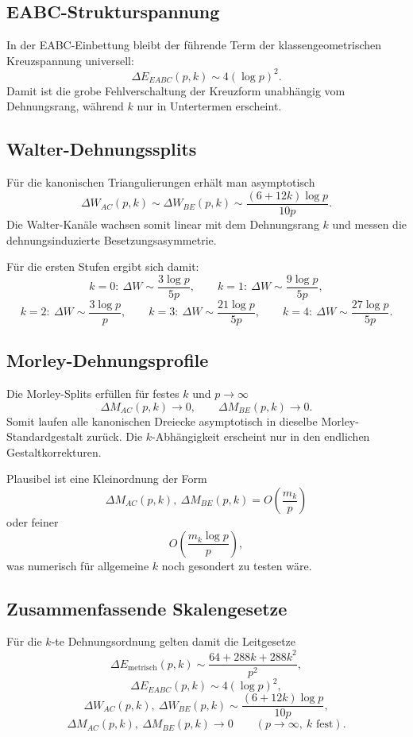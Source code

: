 \subsection{EABC-Strukturspannung}

In der EABC-Einbettung bleibt der führende Term der klassengeometrischen Kreuzspannung universell:
\[
\Delta E_{EABC}(p,k)\sim 4(\log p)^2.
\]
Damit ist die grobe Fehlverschaltung der Kreuzform unabhängig vom Dehnungsrang, während \(k\) nur in Untertermen erscheint.

\subsection{Walter-Dehnungssplits}

Für die kanonischen Triangulierungen erhält man asymptotisch
\[
\Delta W_{AC}(p,k)\sim \Delta W_{BE}(p,k)\sim \frac{(6+12k)\log p}{10p}.
\]
Die Walter-Kanäle wachsen somit linear mit dem Dehnungsrang \(k\) und messen die dehnungsinduzierte Besetzungsasymmetrie.

Für die ersten Stufen ergibt sich damit:
\[
k=0:\ \Delta W \sim \frac{3\log p}{5p},
\qquad
k=1:\ \Delta W \sim \frac{9\log p}{5p},
\]
\[
k=2:\ \Delta W \sim \frac{3\log p}{p},
\qquad
k=3:\ \Delta W \sim \frac{21\log p}{5p},
\qquad
k=4:\ \Delta W \sim \frac{27\log p}{5p}.
\]

\subsection{Morley-Dehnungsprofile}

Die Morley-Splits erfüllen für festes \(k\) und \(p\to\infty\)
\[
\Delta M_{AC}(p,k)\to 0,
\qquad
\Delta M_{BE}(p,k)\to 0.
\]
Somit laufen alle kanonischen Dreiecke asymptotisch in dieselbe Morley-Standardgestalt zurück. Die \(k\)-Abhängigkeit erscheint nur in den endlichen Gestaltkorrekturen.

Plausibel ist eine Kleinordnung der Form
\[
\Delta M_{AC}(p,k),\ \Delta M_{BE}(p,k)=O\!\left(\frac{m_k}{p}\right)
\]
oder feiner
\[
O\!\left(\frac{m_k\log p}{p}\right),
\]
was numerisch für allgemeine \(k\) noch gesondert zu testen wäre.

\subsection{Zusammenfassende Skalengesetze}

Für die \(k\)-te Dehnungsordnung gelten damit die Leitgesetze
\[
\Delta E_{\mathrm{metrisch}}(p,k)
\sim
\frac{64+288k+288k^2}{p^2},
\]
\[
\Delta E_{EABC}(p,k)\sim 4(\log p)^2,
\]
\[
\Delta W_{AC}(p,k),\ \Delta W_{BE}(p,k)\sim \frac{(6+12k)\log p}{10p},
\]
\[
\Delta M_{AC}(p,k),\ \Delta M_{BE}(p,k)\to 0
\qquad (p\to\infty,\ k\text{ fest}).
\]

